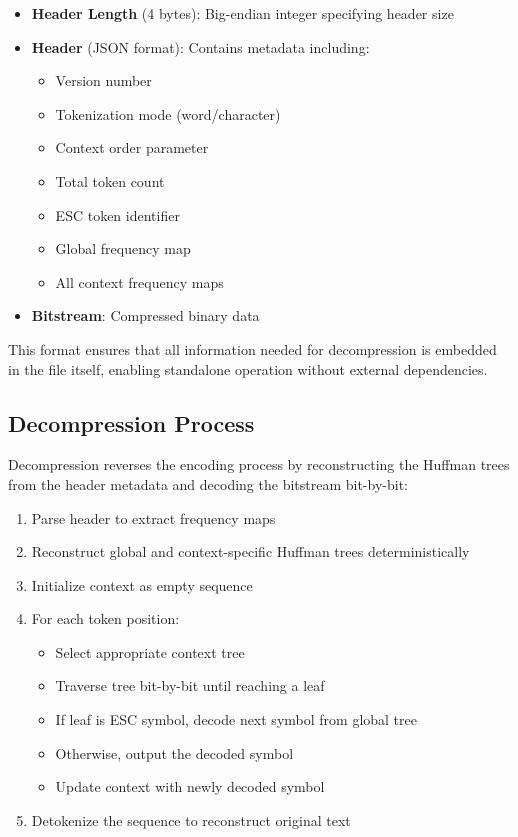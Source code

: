 \documentclass[conference]{IEEEtran}
\begin{document}
\begin{itemize}
\item \textbf{Header Length} (4 bytes): Big-endian integer specifying header size
\item \textbf{Header} (JSON format): Contains metadata including:
    \begin{itemize}
    \item Version number
    \item Tokenization mode (word/character)
    \item Context order parameter
    \item Total token count
    \item ESC token identifier
    \item Global frequency map
    \item All context frequency maps
    \end{itemize}
\item \textbf{Bitstream}: Compressed binary data
\end{itemize}

This format ensures that all information needed for decompression is embedded in the file itself, enabling standalone operation without external dependencies.

\subsection{Decompression Process}
Decompression reverses the encoding process by reconstructing the Huffman trees from the header metadata and decoding the bitstream bit-by-bit:

\begin{enumerate}
\item Parse header to extract frequency maps
\item Reconstruct global and context-specific Huffman trees deterministically
\item Initialize context as empty sequence
\item For each token position:
    \begin{itemize}
    \item Select appropriate context tree
    \item Traverse tree bit-by-bit until reaching a leaf
    \item If leaf is ESC symbol, decode next symbol from global tree
    \item Otherwise, output the decoded symbol
    \item Update context with newly decoded symbol
    \end{itemize}
\item Detokenize the sequence to reconstruct original text
\end{enumerate}
\end{document}
